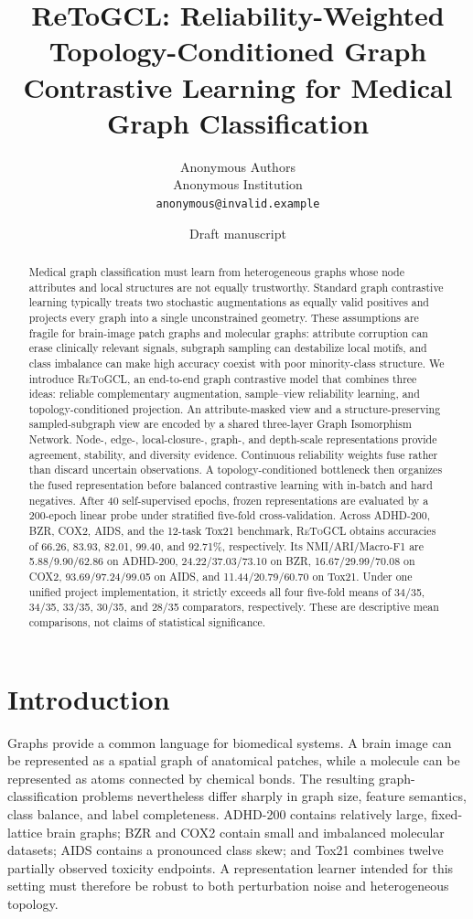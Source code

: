 \documentclass[10pt,twocolumn]{article}
\title{\textbf{ReToGCL: Reliability-Weighted Topology-Conditioned Graph Contrastive Learning for Medical Graph Classification}}
\author{Anonymous Authors\\Anonymous Institution\\\texttt{anonymous@invalid.example}}
\date{Draft manuscript}
\newcommand{\method}{\textsc{ReToGCL}}
\begin{document}
\maketitle

\begin{abstract}
Medical graph classification must learn from heterogeneous graphs whose node attributes and local structures are not equally trustworthy. Standard graph contrastive learning typically treats two stochastic augmentations as equally valid positives and projects every graph into a single unconstrained geometry. These assumptions are fragile for brain-image patch graphs and molecular graphs: attribute corruption can erase clinically relevant signals, subgraph sampling can destabilize local motifs, and class imbalance can make high accuracy coexist with poor minority-class structure. We introduce \method{}, an end-to-end graph contrastive model that combines three ideas: reliable complementary augmentation, sample--view reliability learning, and topology-conditioned projection. An attribute-masked view and a structure-preserving sampled-subgraph view are encoded by a shared three-layer Graph Isomorphism Network. Node-, edge-, local-closure-, graph-, and depth-scale representations provide agreement, stability, and diversity evidence. Continuous reliability weights fuse rather than discard uncertain observations. A topology-conditioned bottleneck then organizes the fused representation before balanced contrastive learning with in-batch and hard negatives. After 40 self-supervised epochs, frozen representations are evaluated by a 200-epoch linear probe under stratified five-fold cross-validation. Across ADHD-200, BZR, COX2, AIDS, and the 12-task Tox21 benchmark, \method{} obtains accuracies of 66.26, 83.93, 82.01, 99.40, and 92.71\%, respectively. Its NMI/ARI/Macro-F1 are 5.88/9.90/62.86 on ADHD-200, 24.22/37.03/73.10 on BZR, 16.67/29.99/70.08 on COX2, 93.69/97.24/99.05 on AIDS, and 11.44/20.79/60.70 on Tox21. Under one unified project implementation, it strictly exceeds all four five-fold means of 34/35, 34/35, 33/35, 30/35, and 28/35 comparators, respectively. These are descriptive mean comparisons, not claims of statistical significance.
\end{abstract}

\section{Introduction}

Graphs provide a common language for biomedical systems. A brain image can be represented as a spatial graph of anatomical patches, while a molecule can be represented as atoms connected by chemical bonds. The resulting graph-classification problems nevertheless differ sharply in graph size, feature semantics, class balance, and label completeness. ADHD-200 contains relatively large, fixed-lattice brain graphs; BZR and COX2 contain small and imbalanced molecular datasets; AIDS contains a pronounced class skew; and Tox21 combines twelve partially observed toxicity endpoints. A representation learner intended for this setting must therefore be robust to both perturbation noise and heterogeneous topology.
\end{document}
